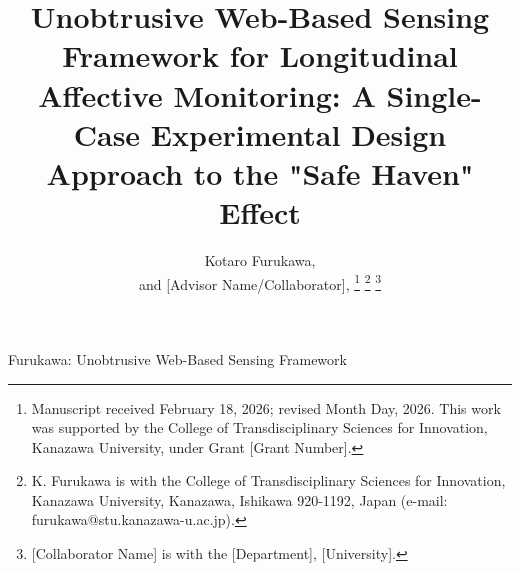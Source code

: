 \documentclass[journal]{IEEEtran}
\begin{document}
\title{Unobtrusive Web-Based Sensing Framework for Longitudinal Affective Monitoring: A Single-Case Experimental Design Approach to the "Safe Haven" Effect}

\author{Kotaro Furukawa, \\ and [Advisor Name/Collaborator], 
\thanks{Manuscript received February 18, 2026; revised Month Day, 2026. This work was supported by the College of Transdisciplinary Sciences for Innovation, Kanazawa University, under Grant [Grant Number].}
\thanks{K. Furukawa is with the College of Transdisciplinary Sciences for Innovation, Kanazawa University, Kanazawa, Ishikawa 920-1192, Japan (e-mail: furukawa@stu.kanazawa-u.ac.jp).}
\thanks{[Collaborator Name] is with the [Department], [University].}}

%
{Furukawa: Unobtrusive Web-Based Sensing Framework}

\maketitle
\end{document}
